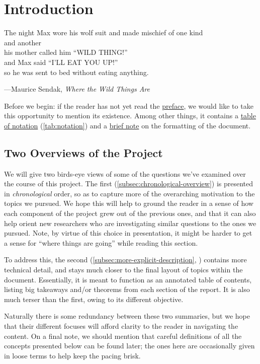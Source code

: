 \chapter{Introduction}\label{chap:intro}
\setlength{}
\epigraph{The night Max wore his wolf suit and made mischief of one kind\\
  and another\\
  his mother called him ``WILD THING!''\\
  and Max said ``I'LL EAT YOU UP!''\\
  so he was sent to bed without eating anything. }{---Maurice Sendak,
  \emph{Where the Wild Things Are}}

Before we begin: if the reader has not yet read the
\hyperlink{chap:preface}{preface}, we would like to take this
opportunity to mention its existence. Among other things, it contains
a \hyperlink{tab:notation}{table of notation} (\cref{tab:notation})
and a \hyperlink{pref:formatting}{brief note} on the formatting of the
document.

\section{Two Overviews of the Project}\label{sec:two-overviews}
We will give two birds-eye views of some of the questions we've
examined over the course of this project. The first
(\cref{subsec:chronological-overview}) is presented in
\emph{chronological} order, so as to capture more of the overarching
motivation to the topics we pursued. We hope this will help to ground
the reader in a sense of how each component of the project grew out of
the previous ones, and that it can also help orient new researchers
who are investigating similar questions to the ones we pursued. Note,
by virtue of this choice in presentation, it might be harder to get a
sense for ``where things are going'' while reading this section.

To address this, the second (\cref{subsec:more-explicit-description},
) contains more technical
detail, and stays much closer to the final layout of topics within the
document. Essentially, it is meant to function as an annotated table
of contents, listing big takeaways and/or theorems from each section
of the report. It is also much terser than the first, owing to its
different objective.

Naturally there is some redundancy between these two summaries, but we
hope that their different focuses will afford clarity to the reader in
navigating the content. On a final note, we should mention that
careful definitions of all the concepts presented below can be found
later; the ones here are occasionally given in loose terms to help
keep the pacing brisk.



